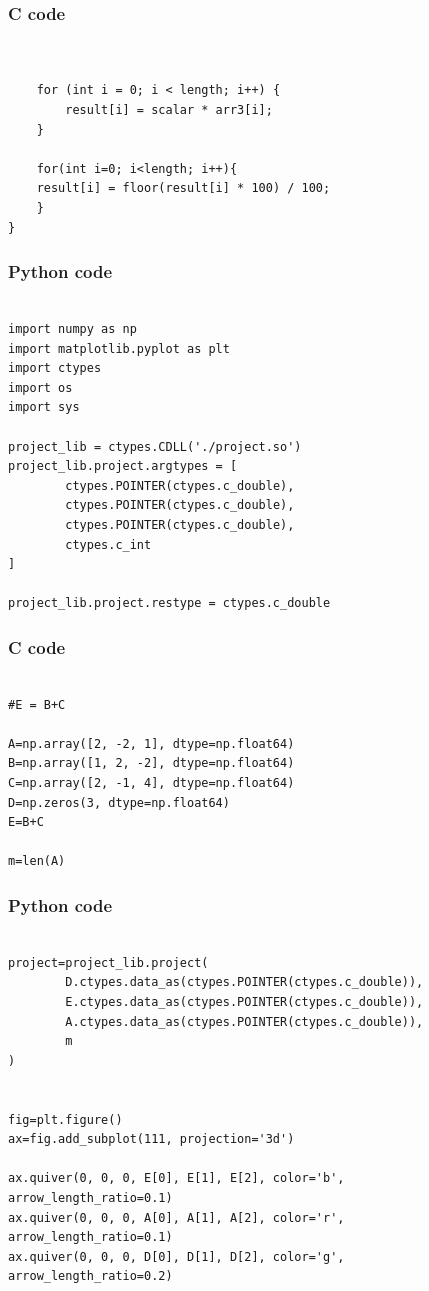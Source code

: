\documentclass{beamer}
\begin{document}
\begin{frame}[fragile]
\frametitle{C code}
\begin{lstlisting}

    
    for (int i = 0; i < length; i++) {
        result[i] = scalar * arr3[i];
    }

    for(int i=0; i<length; i++){
	result[i] = floor(result[i] * 100) / 100;
    }
}

\end{lstlisting}
\end{frame}

\begin{frame}[fragile]
\frametitle{Python code}
\begin{lstlisting}

import numpy as np
import matplotlib.pyplot as plt
import ctypes
import os
import sys

project_lib = ctypes.CDLL('./project.so')
project_lib.project.argtypes = [
        ctypes.POINTER(ctypes.c_double),
        ctypes.POINTER(ctypes.c_double),
        ctypes.POINTER(ctypes.c_double),
        ctypes.c_int
]

project_lib.project.restype = ctypes.c_double

\end{lstlisting}
\end{frame}

\begin{frame}[fragile]
\frametitle{C code}
\begin{lstlisting}

#E = B+C

A=np.array([2, -2, 1], dtype=np.float64)
B=np.array([1, 2, -2], dtype=np.float64)
C=np.array([2, -1, 4], dtype=np.float64)
D=np.zeros(3, dtype=np.float64)
E=B+C

m=len(A)

\end{lstlisting}
\end{frame}

\begin{frame}[fragile]
\frametitle{Python code}
\begin{lstlisting}

project=project_lib.project(
        D.ctypes.data_as(ctypes.POINTER(ctypes.c_double)),
        E.ctypes.data_as(ctypes.POINTER(ctypes.c_double)),
        A.ctypes.data_as(ctypes.POINTER(ctypes.c_double)),
        m
)


fig=plt.figure()
ax=fig.add_subplot(111, projection='3d')

ax.quiver(0, 0, 0, E[0], E[1], E[2], color='b', arrow_length_ratio=0.1)
ax.quiver(0, 0, 0, A[0], A[1], A[2], color='r', arrow_length_ratio=0.1)
ax.quiver(0, 0, 0, D[0], D[1], D[2], color='g', arrow_length_ratio=0.2)

\end{lstlisting}
\end{frame}
\end{document}
